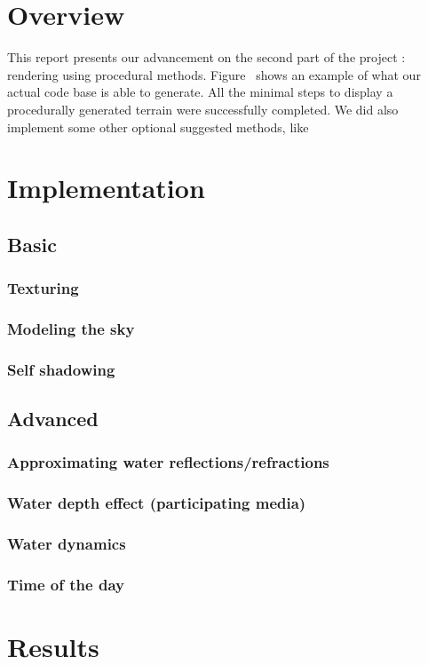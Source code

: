 \documentclass[a4paper,11pt]{article}
\begin{document}
\section{Overview}

This report presents our advancement on the second part of the project : rendering using procedural methods. Figure~ shows an example of what our actual code base is able to generate. All the minimal steps to display a procedurally generated terrain were successfully completed. We did also implement some other optional suggested methods, like 


\section{Implementation}

\subsection{Basic}

\subsubsection{Texturing}

\subsubsection{Modeling the sky}

\subsubsection{Self shadowing}


\subsection{Advanced}

\subsubsection{Approximating water reflections/refractions}

\subsubsection{Water depth effect (participating media)}

\subsubsection{Water dynamics}

\subsubsection{Time of the day}


\section{Results}
\end{document}
